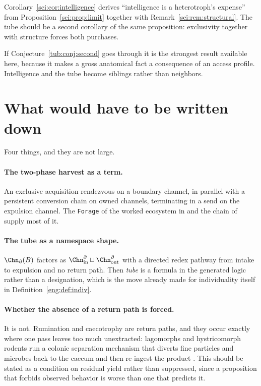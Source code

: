 \begin{conjecture}
\label{tub:conj:second}
Corollary~\ref{sci:cor:intelligence} derives ``intelligence is a heterotroph's
expense'' from Proposition~\ref{sci:prop:limit} together with
Remark~\ref{sci:rem:structural}. The tube should be a second corollary of the
same proposition: exclusivity together with structure forces both purchases.
\end{conjecture}

If Conjecture~\ref{tub:conj:second} goes through it is the strongest result
available here, because it makes a gross anatomical fact a consequence of an
access profile. Intelligence and the tube become siblings rather than neighbors.

\section{What would have to be written down}
\label{tub:sec:formal}

Four things, and they are not large.

\paragraph{The two-phase harvest as a term.} An exclusive acquisition rendezvous
on a boundary channel, in parallel with a persistent conversion chain on owned
channels, terminating in a send on the expulsion channel. The \texttt{Forage} of
the worked ecosystem in \chSci and the chain of \chEng supply most of it.

\paragraph{The tube as a namespace shape.} $\Chn_{\partial}(B)$ factors as
$\Chn_{\mathrm{in}}^{\partial} \sqcup \Chn_{\mathrm{out}}^{\partial}$ with a
directed redex pathway from intake to expulsion and no return path. Then
\emph{tube} is a formula in the generated logic rather than a designation, which
is the move already made for individuality itself in
Definition~\ref{eng:def:indiv}.

\paragraph{Whether the absence of a return path is forced.} It is not.
Rumination and caecotrophy are return paths, and they occur exactly where one
pass leaves too much unextracted: lagomorphs and hystricomorph rodents run a
colonic separation mechanism that diverts fine particles and microbes back to
the caecum and then re-ingest the product \cite{hirakawa2001}. This should be
stated as a condition on residual yield rather than suppressed, since a
proposition that forbids observed behavior is worse than one that predicts it.

